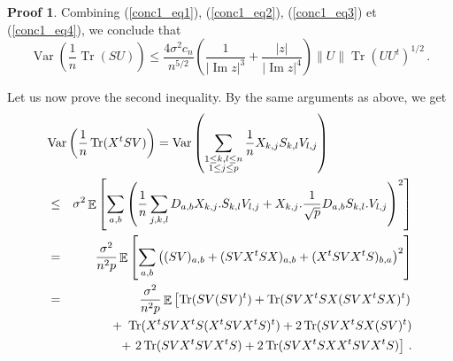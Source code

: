 \documentclass[11pt,a4paper]{article}
\DeclareMathOperator{\E}{\mathbb{E}}
\DeclareMathOperator{\1}{\mathbf{1}}
\DeclareMathOperator{\Imag}{\mathrm{Im}}
\DeclareMathOperator{\Var}{\mathrm{Var}}
\DeclareMathOperator{\Tr}{\mathrm{Tr}}
\theoremstyle{definition}
\newtheorem*{Proof}{Proof}
\begin{document}
\begin{Proof}
Combining (\ref{conc1_eq1}), (\ref{conc1_eq2}), (\ref{conc1_eq3}) et (\ref{conc1_eq4}), we conclude that
\begin{displaymath}
\Var \left( \frac1n \Tr(SU) \right) \le \frac{4 \sigma^2 c_n}{n^{5/2}} \left( \frac{1}{|\Imag z|^3} + \frac{|z|}{|\Imag z|^4} \right) \|U\| \Tr(UU^t)^{1/2} \, .
\end{displaymath}

Let us now prove the second inequality. By the same arguments as above, we get
\begin{eqnarray} \label{conc2_eq1}
\lefteqn{   \Var \left( \frac1n \Tr(X^tSV) \right) = \Var \left( \sum_{\substack{1 \le k,l \le n \\ 1 \le j \le p}} \frac1n X_{k,j}S_{k,l}V_{l,j} \right)   } \nonumber \\
& \le & \sigma^2 \E \left[ \sum_{a,b} \left( \frac1n \sum_{j,k,l} D_{a,b}X_{k,j} . S_{k,l}V_{l,j} + X_{k,j} . \frac{1}{\sqrt{p}} D_{a,b}S_{k,l} . V_{l,j} \right)^2 \right] \nonumber \\
& = & \frac{\sigma^2}{n^2p} \E \left[ \sum_{a,b} \left( (SV)_{a,b} + (SVX^tSX)_{a,b} + (X^tSVX^tS)_{b,a} \right)^2 \right] \nonumber \\
& = & \frac{\sigma^2}{n^2p} \E \left[ \Tr(SV(SV)^t) + \Tr(SVX^tSX(SVX^tSX)^t) \right. \nonumber \\
& & \quad  + \ \Tr(X^tSVX^tS(X^tSVX^tS)^t) + 2 \Tr(SVX^tSX(SV)^t) \nonumber \\
& & \quad \left. + \ 2 \Tr(SVX^tSVX^tS) + 2 \Tr(SVX^tSXX^tSVX^tS) \right] \, .
\end{eqnarray}


\end{Proof}
\end{document}
